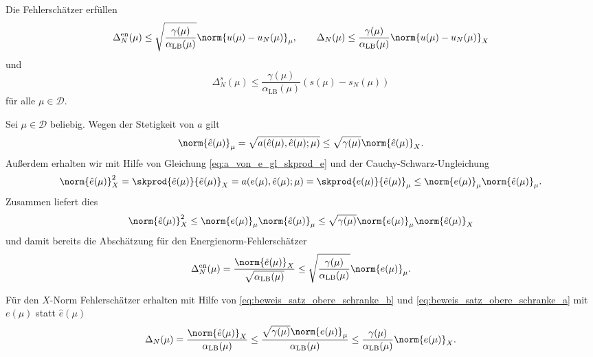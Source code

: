 \begin{Satz}
    Die Fehlerschätzer erfüllen
        \begin{equation}
        \Delta^{\text{en}}_N(\mu) \leq \sqrt{\frac{\gamma(\mu)}{\alpha_{\text{LB}}(\mu)}} \norm{u(\mu) - u_N(\mu)}_{\mu}
        , \qquad
         \Delta_N(\mu) \leq \frac{\gamma(\mu)}{\alpha_{\text{LB}}(\mu)}\norm{u(\mu) - u_N(\mu)}_X
    \end{equation}
    und
    \begin{equation}
        \Delta^s_N(\mu) \leq \frac{\gamma(\mu)}{\alpha_{\text{LB}}(\mu)} \left( s(\mu) - s_N(\mu)  \right)
    \end{equation}
    für alle $\mu \in \mathcal D$.

    \begin{Beweis}
        Sei $\mu \in \mathcal D$ beliebig. Wegen der Stetigkeit von $a$ gilt
        \begin{equation}
            \label{eq:beweis_satz_obere_schranke_a}
            \norm{\hat e(\mu)}_{\mu} = \sqrt{a(\hat e(\mu), \hat e(\mu); \mu)} \leq \sqrt{\gamma(\mu)}\norm{\hat e(\mu)}_X.
        \end{equation}
        Außerdem erhalten wir mit Hilfe von Gleichung \eqref{eq:a_von_e_gl_skprod_e} und der Cauchy-Schwarz-Ungleichung
        \begin{equation}
            \label{eq:beweis_satz_obere_schranke_notag}
            \norm{\hat e(\mu)}^2_X = \skprod{\hat e(\mu)}{\hat e(\mu)}_X = a(e(\mu), \hat e(\mu); \mu)
            = \skprod{e(\mu)}{\hat e(\mu)}_{\mu} \leq \norm{e(\mu)}_{\mu} \norm{\hat e(\mu)}_{\mu}.
        \end{equation}
        Zusammen liefert dies
        \begin{equation}
            \label{eq:beweis_satz_obere_schranke_b}
            \norm{\hat e(\mu)}^2_X \leq \norm{e(\mu)}_{\mu} \norm{\hat e(\mu)}_{\mu} \leq \sqrt{\gamma(\mu)} \norm{e(\mu)}_{\mu} \norm{\hat e(\mu)}_X
        \end{equation}
        und damit bereits die Abschätzung für den Energienorm-Fehlerschätzer
        \begin{equation}
            \Delta_N^{\text{en}}(\mu) = \frac{\norm{\hat e(\mu)}_X}{\sqrt{\alpha_{\text{LB}}(\mu)}} \leq \sqrt{\frac{\gamma(\mu)}{\alpha_{\text{LB}}(\mu)}} \norm{e(\mu)}_{\mu}.
        \end{equation}

        Für den $X$-Norm Fehlerschätzer erhalten mit Hilfe von \eqref{eq:beweis_satz_obere_schranke_b} und \eqref{eq:beweis_satz_obere_schranke_a} mit $e(\mu)$ statt $\hat e(\mu)$
        \begin{equation}
            \Delta_N(\mu)
            = \frac{\norm{\hat e(\mu)}_X}{\alpha_\text{LB}(\mu)}
            \leq \frac{\sqrt{\gamma(\mu)}\norm{e(\mu)}_{\mu} }{\alpha_\text{LB}(\mu)}
            \leq \frac{\gamma(\mu)}{\alpha_\text{LB}(\mu)} \norm{e(\mu)}_X.
        \end{equation}


\end{Beweis}
\end{Satz}
